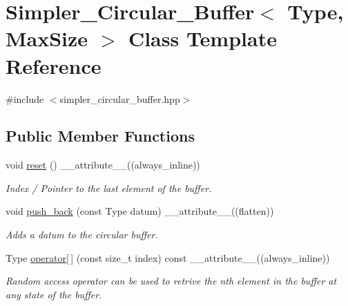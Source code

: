 \hypertarget{classSimpler__Circular__Buffer}{}\section{Simpler\+\_\+\+Circular\+\_\+\+Buffer$<$ Type, Max\+Size $>$ Class Template Reference}
\label{classSimpler__Circular__Buffer}


{\ttfamily \#include $<$simpler\+\_\+circular\+\_\+buffer.\+hpp$>$}

\subsection*{Public Member Functions}
\begin{DoxyCompactItemize}
\item 
void \hyperlink{classSimpler__Circular__Buffer_a793cdb8134afe48ef9918fa0428dfbb6}{reset} () \+\_\+\+\_\+attribute\+\_\+\+\_\+((always\+\_\+inline))
\begin{DoxyCompactList}\small\item\em Index / Pointer to the last element of the buffer. \end{DoxyCompactList}\item 
void \hyperlink{classSimpler__Circular__Buffer_af4bdd0a6d3fc7a8c06f62b0d996158f0}{push\+\_\+back} (const Type datum) \+\_\+\+\_\+attribute\+\_\+\+\_\+((flatten))
\begin{DoxyCompactList}\small\item\em Adds a datum to the circular buffer. \end{DoxyCompactList}\item 
Type \hyperlink{classSimpler__Circular__Buffer_a4ce53bc8ad0d231e9d013c771191696a}{operator\mbox{[}$\,$\mbox{]}} (const size\+\_\+t index) const \+\_\+\+\_\+attribute\+\_\+\+\_\+((always\+\_\+inline))
\begin{DoxyCompactList}\small\item\em Random access operator can be used to retrive the nth element in the buffer at any state of the buffer. \end{DoxyCompactList}\end{DoxyCompactItemize}
